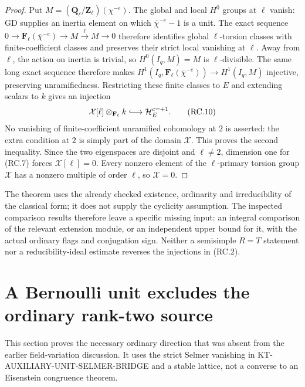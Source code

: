\documentclass[11pt,a4paper]{article}
\theoremstyle{definition}
\begin{document}
\begin{proof}
Put $M=(\mathbf Q_\ell/\mathbf Z_\ell)(\chi^{-e})$.
The global and local $H^0$ groups at $\ell$ vanish:
GD supplies an inertia element on which
$\bar\chi^{-e}-1$ is a unit.  The exact sequence
$0\to\mathbf F_\ell(\bar\chi^{-e})\to M
\xrightarrow{\ell}M\to0$ therefore identifies
global $\ell$-torsion classes with finite-coefficient
classes and preserves their strict local vanishing
at $\ell$.  Away from $\ell$, the action on inertia
is trivial, so $H^0(I_q,M)=M$ is $\ell$-divisible.
The same long exact sequence therefore makes
$H^1(I_q,\mathbf F_\ell(\bar\chi^{-e}))\to H^1(I_q,M)$
injective, preserving unramifiedness.  Restricting these finite classes to
$E$ and extending scalars to $k$ gives an injection
\[
 \mathcal X[\ell]\otimes_{\mathbf F_\ell}k
                  \lhook\joinrel\longrightarrow
                         \mathcal H_E^{c=+1}.              \tag{RC.10}
\]
No vanishing of finite-coefficient unramified cohomology
at $2$ is asserted: the extra condition at $2$ is
simply part of the domain $\mathcal X$.
This proves the second inequality.  Since the two
eigenspaces are disjoint and $\ell\ne2$, dimension
one for (RC.7) forces $\mathcal X[\ell]=0$.
Every nonzero element of the $\ell$-primary torsion
group $\mathcal X$ has a nonzero multiple of order
$\ell$, so $\mathcal X=0$.
\end{proof}

The theorem uses the already checked existence,
ordinarity and irreducibility of the classical form;
it does not supply the cyclicity assumption.
The inspected comparison results therefore leave a
specific missing input: an integral comparison of
the relevant extension module, or an independent
upper bound for it, with the actual ordinary flags
and conjugation sign.  Neither a semisimple $R=T$
statement nor a reducibility-ideal estimate reverses
the injections in (RC.2).



\section{A Bernoulli unit excludes the ordinary rank-two source}
\label{sec:kt-ordinary-rank-two-unit}

This section proves the necessary ordinary direction
that was absent from the earlier field-variation
discussion.  It uses the strict Selmer vanishing in
KT-AUXILIARY-UNIT-SELMER-BRIDGE and a stable lattice,
not a converse to an Eisenstein congruence theorem.
\end{document}
